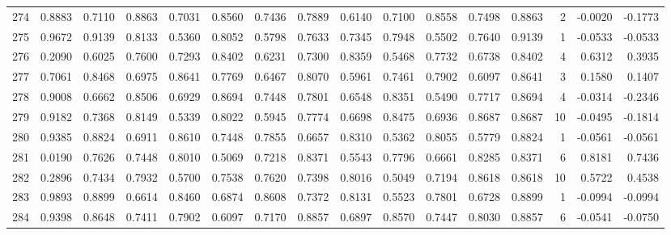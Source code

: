 \begin{tabular}{lrrrrrrrrrrrrrrr}
274 &      0.8883 &  0.7110 &  0.8863 &  0.7031 &  0.8560 &  0.7436 &  0.7889 &  0.6140 &  0.7100 &  0.8558 &   0.7498 &     0.8863 &      2 &                   -0.0020 &                    -0.1773 \\
275 &      0.9672 &  0.9139 &  0.8133 &  0.5360 &  0.8052 &  0.5798 &  0.7633 &  0.7345 &  0.7948 &  0.5502 &   0.7640 &     0.9139 &      1 &                   -0.0533 &                    -0.0533 \\
276 &      0.2090 &  0.6025 &  0.7600 &  0.7293 &  0.8402 &  0.6231 &  0.7300 &  0.8359 &  0.5468 &  0.7732 &   0.6738 &     0.8402 &      4 &                    0.6312 &                     0.3935 \\
277 &      0.7061 &  0.8468 &  0.6975 &  0.8641 &  0.7769 &  0.6467 &  0.8070 &  0.5961 &  0.7461 &  0.7902 &   0.6097 &     0.8641 &      3 &                    0.1580 &                     0.1407 \\
278 &      0.9008 &  0.6662 &  0.8506 &  0.6929 &  0.8694 &  0.7448 &  0.7801 &  0.6548 &  0.8351 &  0.5490 &   0.7717 &     0.8694 &      4 &                   -0.0314 &                    -0.2346 \\
279 &      0.9182 &  0.7368 &  0.8149 &  0.5339 &  0.8022 &  0.5945 &  0.7774 &  0.6698 &  0.8475 &  0.6936 &   0.8687 &     0.8687 &     10 &                   -0.0495 &                    -0.1814 \\
280 &      0.9385 &  0.8824 &  0.6911 &  0.8610 &  0.7448 &  0.7855 &  0.6657 &  0.8310 &  0.5362 &  0.8055 &   0.5779 &     0.8824 &      1 &                   -0.0561 &                    -0.0561 \\
281 &      0.0190 &  0.7626 &  0.7448 &  0.8010 &  0.5069 &  0.7218 &  0.8371 &  0.5543 &  0.7796 &  0.6661 &   0.8285 &     0.8371 &      6 &                    0.8181 &                     0.7436 \\
282 &      0.2896 &  0.7434 &  0.7932 &  0.5700 &  0.7538 &  0.7620 &  0.7398 &  0.8016 &  0.5049 &  0.7194 &   0.8618 &     0.8618 &     10 &                    0.5722 &                     0.4538 \\
283 &      0.9893 &  0.8899 &  0.6614 &  0.8460 &  0.6874 &  0.8608 &  0.7372 &  0.8131 &  0.5523 &  0.7801 &   0.6728 &     0.8899 &      1 &                   -0.0994 &                    -0.0994 \\
284 &      0.9398 &  0.8648 &  0.7411 &  0.7902 &  0.6097 &  0.7170 &  0.8857 &  0.6897 &  0.8570 &  0.7447 &   0.8030 &     0.8857 &      6 &                   -0.0541 &                    -0.0750 \\

\end{tabular}
